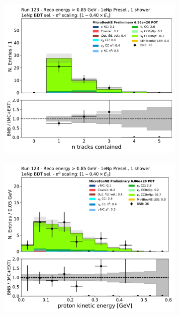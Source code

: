 \begin{figure}[H]
    \centering
    \begin{subfigure}{0.3\textwidth}
    \includegraphics[width=1.0\textwidth]{Sidebands/Figures/1eNp/HighEnergy/HiEext_NPOneShr_NPBDT_pi0e040/n_tracks_contained.pdf}
    \caption{}
    \end{subfigure}
    \begin{subfigure}{0.3\textwidth}
    \includegraphics[width=1.0\textwidth]{Sidebands/Figures/1eNp/HighEnergy/HiEext_NPOneShr_NPBDT_pi0e040/protonenergy.pdf}

\end{subfigure}
\end{figure}
